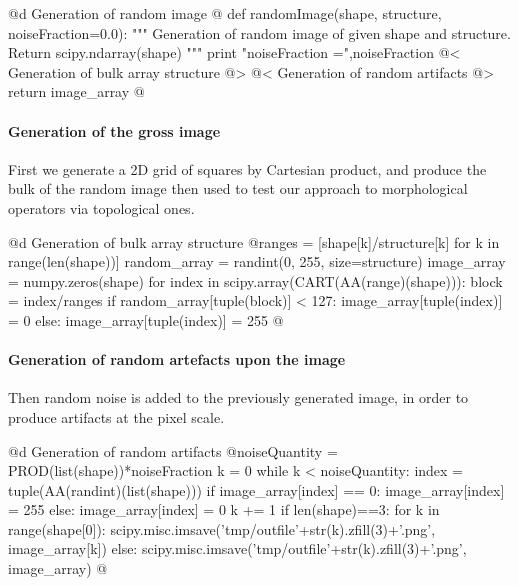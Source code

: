 \documentclass[11pt,oneside]{article}	%
\begin{document}
@d Generation of random image
@{
def randomImage(shape, structure, noiseFraction=0.0):
	""" Generation of random image of given shape and structure. 
		Return scipy.ndarray(shape)
	"""
	print "noiseFraction =",noiseFraction
	@< Generation of bulk array structure @>
	@< Generation of random artifacts @>
	return image_array
@}


\paragraph{Generation of the gross image}
First we generate a 2D grid of squares by Cartesian product, and produce the bulk of the random image then used to test our approach to morphological operators via topological ones.


%
%
%
	
@d Generation of bulk array structure
@{ranges = [shape[k]/structure[k] for k in range(len(shape))]
random_array = randint(0, 255, size=structure)
image_array = numpy.zeros(shape)
for index in scipy.array(CART(AA(range)(shape))):
	block = index/ranges
	if random_array[tuple(block)] < 127:
		image_array[tuple(index)] = 0 
	else: 
		image_array[tuple(index)] = 255
@}



\paragraph{Generation of random artefacts upon the image}

Then random noise is added to the previously generated image, in order to produce artifacts at the pixel scale. 

@d Generation of random artifacts
@{noiseQuantity = PROD(list(shape))*noiseFraction
k = 0
while k < noiseQuantity:
	index = tuple(AA(randint)(list(shape)))
	if image_array[index] == 0: image_array[index] = 255
	else: image_array[index] = 0
	k += 1
if len(shape)==3:
	for k in range(shape[0]):
		scipy.misc.imsave('tmp/outfile'+str(k).zfill(3)+'.png', image_array[k])
else:
	scipy.misc.imsave('tmp/outfile'+str(k).zfill(3)+'.png', image_array)
@}
\end{document}

